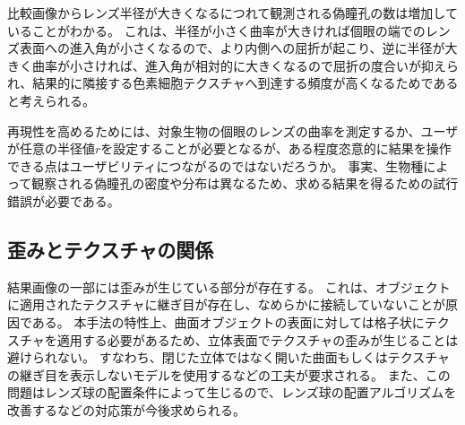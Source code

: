 比較画像からレンズ半径が大きくなるにつれて観測される偽瞳孔の数は増加していることがわかる。
これは、半径が小さく曲率が大きければ個眼の端でのレンズ表面への進入角が小さくなるので、より内側への屈折が起こり、逆に半径が大きく曲率が小さければ、進入角が相対的に大きくなるので屈折の度合いが抑えられ、結果的に隣接する色素細胞テクスチャへ到達する頻度が高くなるためであると考えられる。

再現性を高めるためには、対象生物の個眼のレンズの曲率を測定するか、ユーザが任意の半径値$r$を設定することが必要となるが、ある程度恣意的に結果を操作できる点はユーザビリティにつながるのではないだろうか。
事実、生物種によって観察される偽瞳孔の密度や分布は異なるため、求める結果を得るための試行錯誤が必要である。


\subsection{歪みとテクスチャの関係}
\label{SSDistortion}

結果画像の一部には歪みが生じている部分が存在する。
これは、オブジェクトに適用されたテクスチャに継ぎ目が存在し、なめらかに接続していないことが原因である。
本手法の特性上、曲面オブジェクトの表面に対しては格子状にテクスチャを適用する必要があるため、立体表面でテクスチャの歪みが生じることは避けられない。
すなわち、閉じた立体ではなく開いた曲面もしくはテクスチャの継ぎ目を表示しないモデルを使用するなどの工夫が要求される。
また、この問題はレンズ球の配置条件によって生じるので、レンズ球の配置アルゴリズムを改善するなどの対応策が今後求められる。

